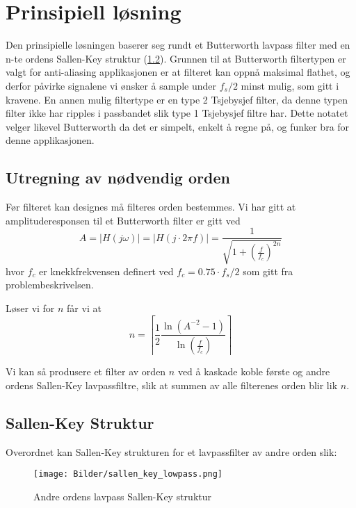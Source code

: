 \section{Prinsipiell løsning}
\label{prinsipiellLoesning}

Den prinsipielle løsningen baserer seg rundt et Butterworth lavpass filter med en n-te ordens Sallen-Key struktur (\ref{sallen-key}). 
Grunnen til at Butterworth filtertypen er valgt for anti-aliasing applikasjonen er at filteret kan oppnå maksimal flathet, og derfor 
påvirke signalene vi ønsker å sample under $f_s/2$ minst mulig, som gitt i kravene. En annen mulig filtertype er en type 2 Tsjebysjef filter, da denne typen 
filter ikke har ripples i passbandet slik type 1 Tsjebysjef filtre har. Dette notatet velger likevel Butterworth da det er simpelt, enkelt å regne på, 
og funker bra for denne applikasjonen.

\subsection{Utregning av nødvendig orden}
Før filteret kan designes må filteres orden bestemmes. Vi har gitt at amplituderesponsen til et Butterworth filter 
er gitt ved \cite{lundheim-butterworth-amplitude-respons}
\begin{equation}
    A = |H(j\omega)| = |H(j \cdot 2\pi f)| = \frac{1}{\sqrt{1 + \left(\frac{f}{f_c}\right)^{2n}}}
\end{equation}
hvor $f_c$ er knekkfrekvensen definert ved $f_c = 0.75 \cdot f_s / 2$ som gitt fra problembeskrivelsen.

Løser vi for $n$ får vi at
\begin{equation}
    n = \left\lceil\frac{1}{2}\frac{\ln{\left(A^{-2} - 1\right)}}{\ln{\left(\frac{f}{f_c}\right)}}\right\rceil
\end{equation}

Vi kan så produsere et filter av orden $n$ ved å kaskade koble første og andre ordens Sallen-Key lavpassfiltre, slik at 
summen av alle filterenes orden blir lik $n$.

\subsection{Sallen-Key Struktur}
\label{sallen-key}
Overordnet kan Sallen-Key strukturen for et lavpassfilter av andre orden slik:
\begin{figure}[H]
    \centering
    \texttt{[image: Bilder/sallen\_key\_lowpass.png]}
    \caption{Andre ordens lavpass Sallen-Key struktur \cite{sallen-key-lowpass-wikipedia}}
\end{figure}

